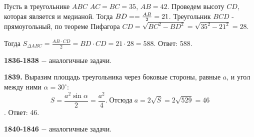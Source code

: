 Пусть в треугольнике $ABC$ $AC = BC = 35$, $AB = 42$. Проведем высоту $CD$, которая является и медианой. Тогда $BD = \linebreak =\frac{AB}{2} = 21$. Треугольник  $BCD$ - прямоугольный, по теореме Пифагора $CD = \sqrt{BC^2 - BD^2} = \sqrt{35^2 - 21^2} = 28.$

Тогда $S_{\Delta ABC} = \frac{AB \cdot CD}{2} = BD \cdot CD = 21 \cdot 28 = 588.$ \newline \null \hspace*{\fill} Ответ: 588.

\textbf{1836-1838} $-$ аналогичные задачи.

\textbf{1839.}  Выразим площадь треугольника через боковые стороны, равные $a$, и угол между ними $\alpha = 30^\circ$:
\[
S = \frac{a^2 \sin{\alpha}}{2} = \frac{a^2}{4}.\; Отсюда \;a = 2\sqrt{S} = 2\sqrt{529} = 46
\]. \null \hspace*{\fill} Ответ: 46.

\textbf{1840-1846} $-$ аналогичные задачи.